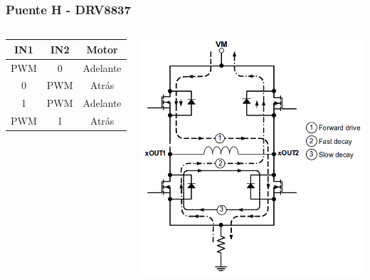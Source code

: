 \documentclass[compress]{beamer}
\begin{document}
\begin{frame}
 \frametitle{Puente H - DRV8837}
\begin{columns} 
{%
\begin{center}
\begin{tabular}{|c|c|c|}\hline
\textbf{IN1} & \textbf{IN2} & \textbf{Motor} \\ \hline
PWM & 0 & Adelante\\ \hline
0 & PWM & Atrás\\ \hline
1 & PWM & Adelante\\ \hline
PWM & 1 & Atrás\\ \hline
\end{tabular}
\end{center}
}%
 \begin{center}
 \includegraphics[width=\columnwidth]{./img/drv8833.png}
\end{center}
\end{columns}
\end{frame}
\end{document}
